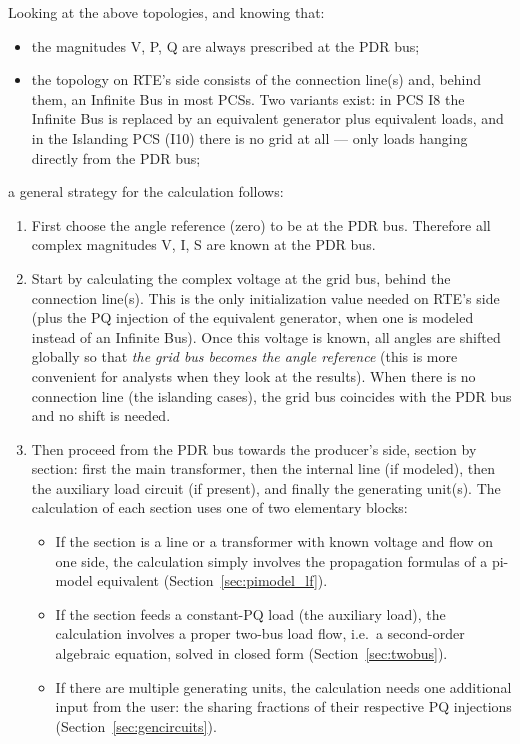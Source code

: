 \documentclass[a4paper,11pt]{article}
\begin{document}
Looking at the above topologies, and knowing that:
\begin{itemize}
\item the magnitudes V, P, Q are always prescribed at the PDR bus;
\item the topology on RTE's side consists of the connection line(s) and, behind them, an
  Infinite Bus in most PCSs. Two variants exist: in PCS I8 the Infinite Bus is replaced
  by an equivalent generator plus equivalent loads, and in the Islanding PCS (I10) there
  is no grid at all --- only loads hanging directly from the PDR bus;
\end{itemize}
a general strategy for the calculation follows:
\begin{enumerate}
\item First choose the angle reference (zero) to be at the PDR bus. Therefore all
  complex magnitudes V, I, S are known at the PDR bus.
\item Start by calculating the complex voltage at the grid bus, behind the connection
  line(s). This is the only initialization value needed on RTE's side (plus the PQ
  injection of the equivalent generator, when one is modeled instead of an Infinite
  Bus). Once this voltage is known, all angles are shifted globally so that \emph{the
    grid bus becomes the angle reference} (this is more convenient for analysts when
  they look at the results). When there is no connection line (the islanding cases), the
  grid bus coincides with the PDR bus and no shift is needed.
\item Then proceed from the PDR bus towards the producer's side, section by section:
  first the main transformer, then the internal line (if modeled), then the auxiliary
  load circuit (if present), and finally the generating unit(s). The calculation of each
  section uses one of two elementary blocks:
  \begin{itemize}
  \item If the section is a line or a transformer with known voltage and flow on one
    side, the calculation simply involves the propagation formulas of a pi-model
    equivalent (Section~\ref{sec:pimodel_lf}).
  \item If the section feeds a constant-PQ load (the auxiliary load), the calculation
    involves a proper two-bus load flow, i.e.\ a second-order algebraic equation, solved
    in closed form (Section~\ref{sec:twobus}).
  \item If there are multiple generating units, the calculation needs one additional
    input from the user: the sharing fractions of their respective PQ injections
    (Section~\ref{sec:gencircuits}).
  \end{itemize}
\end{enumerate}
\end{document}
